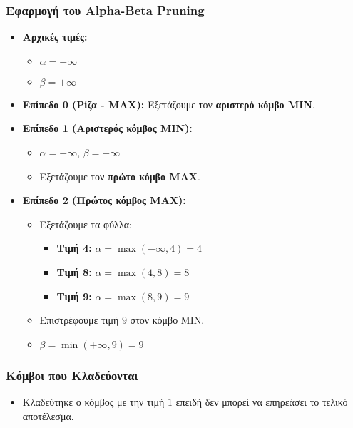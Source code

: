 \documentclass{article}
\begin{document}
\subsubsection*{Εφαρμογή του Alpha-Beta Pruning}

\begin{itemize}
    \item \textbf{Αρχικές τιμές:}
    \begin{itemize}
        \item \(\alpha = -\infty\)
        \item \(\beta = +\infty\)
    \end{itemize}
    \item \textbf{Επίπεδο 0 (Ρίζα - MAX):} Εξετάζουμε τον \textbf{αριστερό κόμβο MIN}.
    \item \textbf{Επίπεδο 1 (Αριστερός κόμβος MIN):}
    \begin{itemize}
        \item \(\alpha = -\infty\), \(\beta = +\infty\)
        \item Εξετάζουμε τον \textbf{πρώτο κόμβο MAX}.
    \end{itemize}
    \item \textbf{Επίπεδο 2 (Πρώτος κόμβος MAX):}
    \begin{itemize}
        \item Εξετάζουμε τα φύλλα:
        \begin{itemize}
            \item \textbf{Τιμή 4:} \(\alpha = \max(-\infty, 4) = 4\)
            \item \textbf{Τιμή 8:} \(\alpha = \max(4, 8) = 8\)
            \item \textbf{Τιμή 9:} \(\alpha = \max(8, 9) = 9\)
        \end{itemize}
        \item Επιστρέφουμε τιμή \(9\) στον κόμβο MIN.
        \item \(\beta = \min(+\infty, 9) = 9\)
    \end{itemize}
\end{itemize}

\subsubsection*{Κόμβοι που Κλαδεύονται}

\begin{itemize}
    \item Κλαδεύτηκε ο κόμβος με την τιμή \(1\) επειδή δεν μπορεί να επηρεάσει το τελικό αποτέλεσμα.
\end{itemize}
\end{document}
